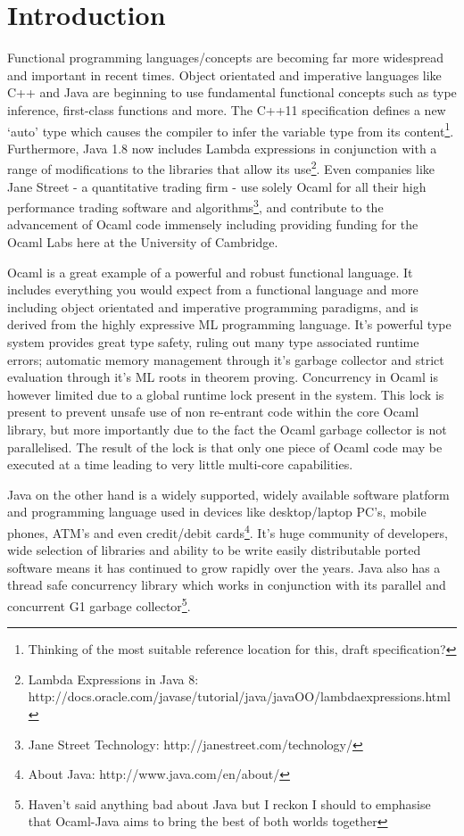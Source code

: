 \documentclass[a4paper]{article}
\begin{document}


\section{Introduction}
\label{sec:introduction}
Functional programming languages/concepts are becoming far more widespread and important in recent times. Object orientated and imperative languages like C++ and Java are beginning to use fundamental functional concepts such as type inference, first-class functions and more. The C++11 specification defines a new `auto' type which causes the compiler to infer the variable type from its content\footnote{Thinking of the most suitable reference location for this, draft specification?}. Furthermore, Java 1.8 now includes Lambda expressions in conjunction with a range of modifications to the libraries that allow its use\footnote{Lambda Expressions in Java 8: http://docs.oracle.com/javase/tutorial/java/javaOO/lambdaexpressions.html}. Even companies like Jane Street - a quantitative trading firm - use solely Ocaml for all their high performance trading software and algorithms\footnote{Jane Street Technology: http://janestreet.com/technology/}, and contribute to the advancement of Ocaml code immensely including providing funding for the Ocaml Labs here at the University of Cambridge.

Ocaml is a great example of a powerful and robust functional language. It includes everything you would expect from a functional language and more including object orientated and imperative programming paradigms, and is derived from the highly expressive ML programming language. It's powerful type system provides great type safety, ruling out many type associated runtime errors; automatic memory management through it's garbage collector and strict evaluation through it's ML roots in theorem proving. Concurrency in Ocaml is however limited due to a global runtime lock present in the system. This lock is present to prevent unsafe use of non re-entrant code within the core Ocaml library, but more importantly due to the fact the Ocaml garbage collector is not parallelised. The result of the lock is that only one piece of Ocaml code may be executed at a time leading to very little multi-core capabilities.   

Java on the other hand is a widely supported, widely available software platform and programming language used in devices like desktop/laptop PC's, mobile phones, ATM's and even credit/debit cards\footnote{About Java: http://www.java.com/en/about/}. It's huge community of developers, wide selection of libraries and ability to be write easily distributable ported software means it has continued to grow rapidly over the years. Java also has a thread safe concurrency library which works in conjunction with its parallel and concurrent G1 garbage collector\footnote{Haven't said anything bad about Java but I reckon I should to emphasise that Ocaml-Java aims to bring the best of both worlds together}.
\end{document}
